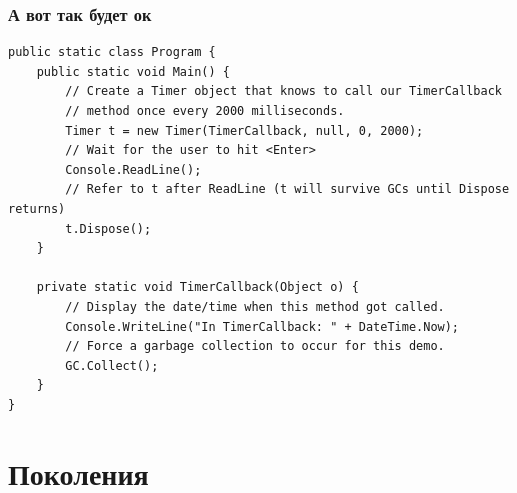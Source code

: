 \documentclass[xetex,mathserif,serif]{beamer}
\begin{document}
    \begin{frame}[fragile]
        \frametitle{А вот так будет ок}
        \begin{footnotesize}
            \begin{verbatim}
public static class Program {
    public static void Main() {
        // Create a Timer object that knows to call our TimerCallback
        // method once every 2000 milliseconds.
        Timer t = new Timer(TimerCallback, null, 0, 2000);
        // Wait for the user to hit <Enter>
        Console.ReadLine();
        // Refer to t after ReadLine (t will survive GCs until Dispose returns)
        t.Dispose();
    }

    private static void TimerCallback(Object o) {
        // Display the date/time when this method got called.
        Console.WriteLine("In TimerCallback: " + DateTime.Now);
        // Force a garbage collection to occur for this demo.
        GC.Collect();
    }
}
            \end{verbatim}
        \end{footnotesize}
    \end{frame}

    \section{Поколения}
\end{document}
